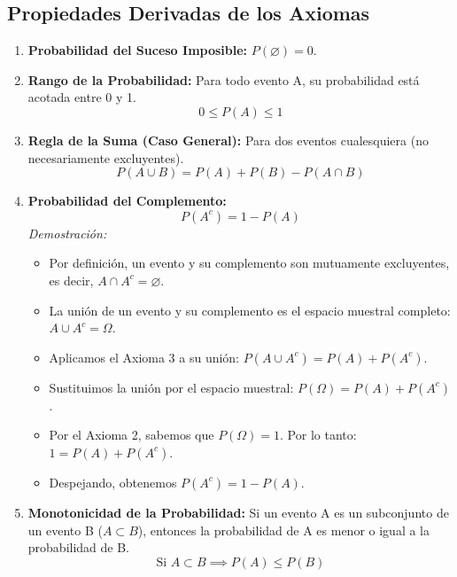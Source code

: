 \documentclass[12pt, letterpaper]{article}
\begin{document}
\subsection{Propiedades Derivadas de los Axiomas}
\begin{enumerate}
	\item \textbf{Probabilidad del Suceso Imposible:} $P(\varnothing) = 0$.
	\item \textbf{Rango de la Probabilidad:} Para todo evento A, su probabilidad está acotada entre 0 y 1.
	      \[ 0 \le P(A) \le 1 \]
	\item \textbf{Regla de la Suma (Caso General):} Para dos eventos cualesquiera (no necesariamente excluyentes).
	      \[ P(A \cup B) = P(A) + P(B) - P(A \cap B) \]
	\item \textbf{Probabilidad del Complemento:}
	      \[ P(A^c) = 1 - P(A) \]
	      \textit{Demostración:}
	      \begin{itemize}
		      \item Por definición, un evento y su complemento son mutuamente excluyentes, es decir, $A \cap A^c = \varnothing$.
		      \item La unión de un evento y su complemento es el espacio muestral completo: $A \cup A^c = \Omega$.
		      \item Aplicamos el Axioma 3 a su unión: $P(A \cup A^c) = P(A) + P(A^c)$.
		      \item Sustituimos la unión por el espacio muestral: $P(\Omega) = P(A) + P(A^c)$.
		      \item Por el Axioma 2, sabemos que $P(\Omega)=1$. Por lo tanto: $1 = P(A) + P(A^c)$.
		      \item Despejando, obtenemos $P(A^c) = 1 - P(A)$.
	      \end{itemize}
	\item \textbf{Monotonicidad de la Probabilidad:} Si un evento A es un subconjunto de un evento B ($A \subset B$), entonces la probabilidad de A es menor o igual a la probabilidad de B.
	      \[ \text{Si } A \subset B \implies P(A) \le P(B) \]
\end{enumerate}
\end{document}

